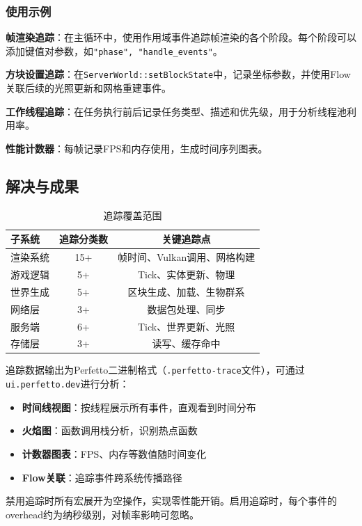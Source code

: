 \subsubsection{使用示例}

\textbf{帧渲染追踪}：在主循环中，使用作用域事件追踪帧渲染的各个阶段。每个阶段可以添加键值对参数，如\texttt{"phase", "handle\_events"}。

\textbf{方块设置追踪}：在\texttt{ServerWorld::setBlockState}中，记录坐标参数，并使用Flow关联后续的光照更新和网格重建事件。

\textbf{工作线程追踪}：在任务执行前后记录任务类型、描述和优先级，用于分析线程池利用率。

\textbf{性能计数器}：每帧记录FPS和内存使用，生成时间序列图表。

\subsection{解决与成果}

\begin{table}[h]
\centering
\caption{追踪覆盖范围}
\label{tab:trace_coverage}
\begin{tabular}{lcc}
\toprule
\textbf{子系统} & \textbf{追踪分类数} & \textbf{关键追踪点} \\
\midrule
渲染系统 & 15+ & 帧时间、Vulkan调用、网格构建 \\
游戏逻辑 & 5+ & Tick、实体更新、物理 \\
世界生成 & 5+ & 区块生成、加载、生物群系 \\
网络层 & 3+ & 数据包处理、同步 \\
服务端 & 6+ & Tick、世界更新、光照 \\
存储层 & 3+ & 读写、缓存命中 \\
\bottomrule
\end{tabular}
\end{table}

追踪数据输出为Perfetto二进制格式（\texttt{.perfetto-trace}文件），可通过\texttt{ui.perfetto.dev}进行分析：

\begin{itemize}
    \item \textbf{时间线视图}：按线程展示所有事件，直观看到时间分布
    \item \textbf{火焰图}：函数调用栈分析，识别热点函数
    \item \textbf{计数器图表}：FPS、内存等数值随时间变化
    \item \textbf{Flow关联}：追踪事件跨系统传播路径
\end{itemize}

禁用追踪时所有宏展开为空操作，实现零性能开销。启用追踪时，每个事件的overhead约为纳秒级别，对帧率影响可忽略。
